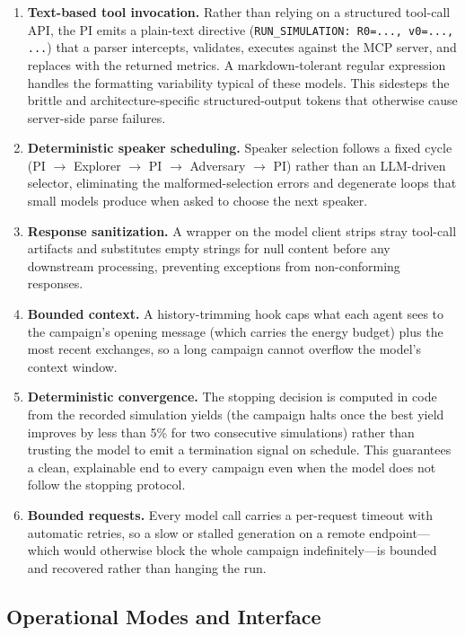 \documentclass[conference]{IEEEtran}
\begin{document}
\begin{enumerate}
    \item \textbf{Text-based tool invocation.} Rather than relying on a structured tool-call API, the PI emits a plain-text directive (\texttt{RUN\_SIMULATION: R0=..., v0=..., ...}) that a parser intercepts, validates, executes against the MCP server, and replaces with the returned metrics.  A markdown-tolerant regular expression handles the formatting variability typical of these models.  This sidesteps the brittle and architecture-specific structured-output tokens that otherwise cause server-side parse failures.
    \item \textbf{Deterministic speaker scheduling.} Speaker selection follows a fixed cycle (PI $\rightarrow$ Explorer $\rightarrow$ PI $\rightarrow$ Adversary $\rightarrow$ PI) rather than an LLM-driven selector, eliminating the malformed-selection errors and degenerate loops that small models produce when asked to choose the next speaker.
    \item \textbf{Response sanitization.} A wrapper on the model client strips stray tool-call artifacts and substitutes empty strings for null content before any downstream processing, preventing exceptions from non-conforming responses.
    \item \textbf{Bounded context.} A history-trimming hook caps what each agent sees to the campaign's opening message (which carries the energy budget) plus the most recent exchanges, so a long campaign cannot overflow the model's context window.
    \item \textbf{Deterministic convergence.} The stopping decision is computed in code from the recorded simulation yields (the campaign halts once the best yield improves by less than 5\% for two consecutive simulations) rather than trusting the model to emit a termination signal on schedule.  This guarantees a clean, explainable end to every campaign even when the model does not follow the stopping protocol.
    \item \textbf{Bounded requests.} Every model call carries a per-request timeout with automatic retries, so a slow or stalled generation on a remote endpoint---which would otherwise block the whole campaign indefinitely---is bounded and recovered rather than hanging the run.
\end{enumerate}

\subsection{Operational Modes and Interface}
\end{document}
